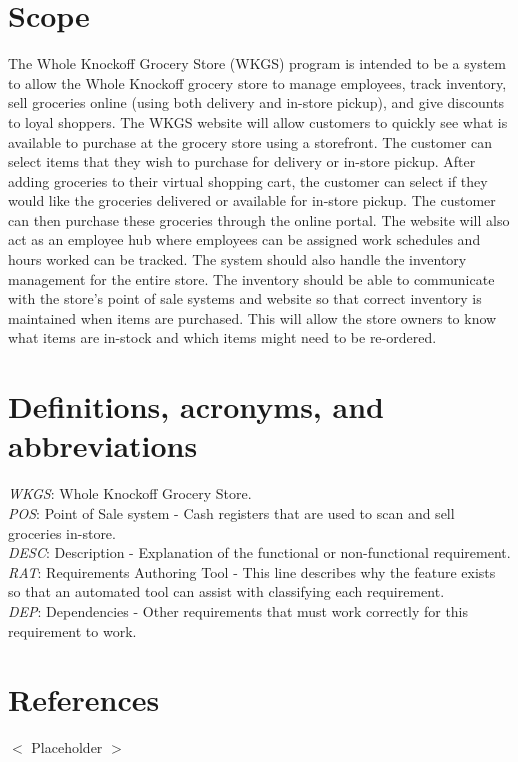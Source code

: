 \documentclass{scrreprt}
\theoremstyle{funreq}
\begin{document}
\section{Scope}
The Whole Knockoff Grocery Store (WKGS) program is intended to be a system to allow the Whole Knockoff grocery store to manage employees, track inventory, sell groceries online (using both delivery and in-store pickup), and give discounts to loyal shoppers.  The WKGS website will allow customers to quickly see what is available to purchase at the grocery store using a storefront.  The customer can select items that they wish to purchase for delivery or in-store pickup.  After adding groceries to their virtual shopping cart, the customer can select if they would like the groceries delivered or available for in-store pickup.  The customer can then purchase these groceries through the online portal.  The website will also act as an employee hub where employees can be assigned work schedules and hours worked can be tracked.  The system should also handle the inventory management for the entire store.  The inventory should be able to communicate with the store's point of sale systems and website so that correct inventory is maintained when items are purchased.  This will allow the store owners to know what items are in-stock and which items might need to be re-ordered.

\section{Definitions, acronyms, and abbreviations}
\textit{WKGS}: Whole Knockoff Grocery Store.\\
\textit{POS}: Point of Sale system - Cash registers that are used to scan and sell groceries in-store.\\
\textit{DESC}: Description - Explanation of the functional or non-functional requirement.\\
\textit{RAT}: Requirements Authoring Tool - This line describes why the feature exists so that an automated tool can assist with classifying each requirement.\\
\textit{DEP}: Dependencies - Other requirements that must work correctly for this requirement to work.\\


\section{References}
$<$ Placeholder $>$
\end{document}
